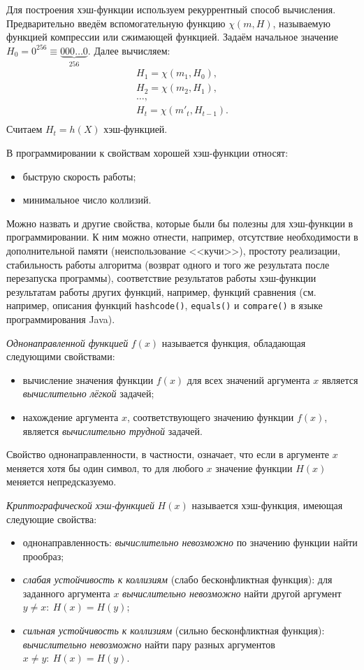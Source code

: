 Для построения хэш-функции используем рекуррентный способ вычисления. Предварительно введём вспомогательную функцию $\chi(m, H)$, называемую функцией компрессии или сжимающей функцией. Задаём начальное значение $H_{0} = 0^{256} \equiv \underbrace{000 \ldots 0}_{256} $. Далее вычисляем:
\[ \begin{array}{l}
    H_1 = \chi( m_1, H_0), \\
    H_2 = \chi( m_2, H_1), \\
    \dots,\\
    H_t = \chi( m'_t, H_{t-1}). \\
\end{array} \]
Считаем $H_{t} = h(X)$ хэш-функцией.
\exampleend

В программировании к свойствам хорошей хэш-функции относят:
\begin{itemize}
    \item быструю скорость работы;
    \item минимальное число коллизий.
\end{itemize}

Можно назвать и другие свойства, которые были бы полезны для хэш-функции в программировании. К ним можно отнести, например, отсутствие необходимости в дополнительной памяти (неиспользование <<кучи>>), простоту реализации, стабильность работы алгоритма (возврат одного и того же результата после перезапуска программы), соответствие результатов работы хэш-функции результатам работы других функций, например, функций сравнения (см. например, описания функций \texttt{hashcode()}, \texttt{equals()} и \texttt{compare()} в языке программирования Java).

\emph{Однонаправленной функцией} $f(x)$ называется функция, обладающая следующими свойствами:
\begin{itemize}
    \item вычисление значения функции $f(x)$ для всех значений аргумента $x$ является \emph{вычислительно лёгкой} задачей;
    \item нахождение аргумента $x$, соответствующего значению функции $f(x)$, является \emph{вычислительно трудной} задачей.
\end{itemize}

Свойство однонаправленности, в частности, означает, что если в аргументе $x$ меняется хотя бы один символ, то для любого $x$ значение функции $H(x)$ меняется непредсказуемо.

\emph{Криптографической хэш-функцией} $H(x)$ называется хэш-функция, имеющая следующие свойства:
\begin{itemize}
    \item однонаправленность: \emph{вычислительно невозможно} по значению функции найти прообраз;
    \item \emph{слабая устойчивость к коллизиям} (слабо бесконфликтная функция): для заданного аргумента $x$ \emph{вычислительно невозможно} найти другой аргумент $y \neq x: ~ H(x) = H(y)$;
    \item \emph{сильная устойчивость к коллизиям} (сильно бесконфликтная функция): \emph{вычислительно невозможно} найти пару разных аргументов $x \neq y: ~ H(x) = H(y)$.
\end{itemize}

